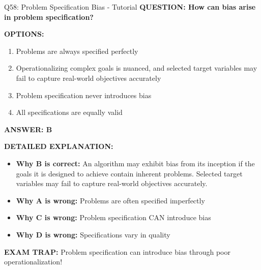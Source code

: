 \documentclass[8pt]{beamer}
\begin{document}
	\begin{frame}{Q58: Problem Specification Bias - Tutorial}
		\fontsize{6.5}{7.5}\selectfont
		\textbf{QUESTION: How can bias arise in problem specification?}
		
		\vspace{0.1cm}
		\textbf{OPTIONS:}
		\begin{enumerate}
			\item Problems are always specified perfectly
			\item Operationalizing complex goals is nuanced, and selected target variables may fail to capture real-world objectives accurately
			\item Problem specification never introduces bias
			\item All specifications are equally valid
		\end{enumerate}
		
		\vspace{0.1cm}
		\textcolor{myblue}{\textbf{ANSWER: B}}
		
		\vspace{0.1cm}
		\textbf{DETAILED EXPLANATION:}
		\begin{itemize}
			\item \textbf{Why B is correct:} An algorithm may exhibit bias from its inception if the goals it is designed to achieve contain inherent problems. Selected target variables may fail to capture real-world objectives accurately.
			\item \textbf{Why A is wrong:} Problems are often specified imperfectly
			\item \textbf{Why C is wrong:} Problem specification CAN introduce bias
			\item \textbf{Why D is wrong:} Specifications vary in quality
		\end{itemize}
		
		\textcolor{myred}{\textbf{EXAM TRAP:}} Problem specification can introduce \textcolor{myblue}{bias through poor operationalization}!
	\end{frame}
	
\end{document}
